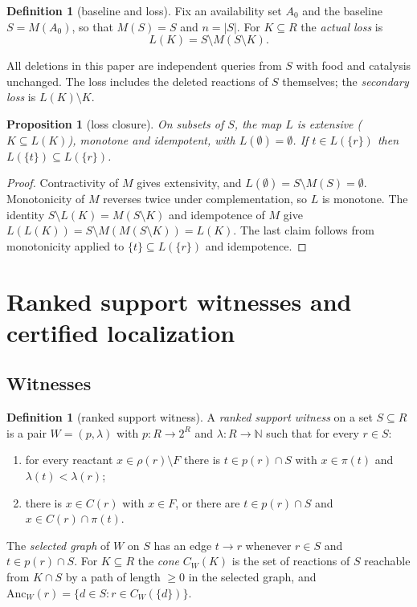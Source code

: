\documentclass[11pt,a4paper]{article}
\theoremstyle{plain}
\newtheorem{proposition}[theorem]{Proposition}
\theoremstyle{definition}
\newtheorem{definition}[theorem]{Definition}
\theoremstyle{remark}
\newcommand{\N}{\mathbb{N}}
\newcommand{\Anc}{\mathrm{Anc}}
\begin{document}
\begin{definition}[baseline and loss]
Fix an availability set $A_0$ and the baseline $S=M(A_0)$, so that $M(S)=S$ and $n=|S|$. For $K\subseteq R$ the \emph{actual loss} is
\[
L(K)=S\setminus M(S\setminus K).
\]
\end{definition}

All deletions in this paper are independent queries from $S$ with food and catalysis unchanged. The loss includes the deleted reactions of $S$ themselves; the \emph{secondary loss} is $L(K)\setminus K$.

\begin{proposition}[loss closure]\label{prop:lossclosure}
On subsets of $S$, the map $L$ is extensive ($K\subseteq L(K)$), monotone and idempotent, with $L(\emptyset)=\emptyset$. If $t\in L(\{r\})$ then $L(\{t\})\subseteq L(\{r\})$.
\end{proposition}

\begin{proof}
Contractivity of $M$ gives extensivity, and $L(\emptyset)=S\setminus M(S)=\emptyset$. Monotonicity of $M$ reverses twice under complementation, so $L$ is monotone. The identity $S\setminus L(K)=M(S\setminus K)$ and idempotence of $M$ give $L(L(K))=S\setminus M(M(S\setminus K))=L(K)$. The last claim follows from monotonicity applied to $\{t\}\subseteq L(\{r\})$ and idempotence.
\end{proof}

\section{Ranked support witnesses and certified localization}\label{sec:localization}

\subsection{Witnesses}

\begin{definition}[ranked support witness]\label{def:witness}
A \emph{ranked support witness} on a set $S\subseteq R$ is a pair $W=(p,\lambda)$ with $p:R\to 2^{R}$ and $\lambda:R\to\N$ such that for every $r\in S$:
\begin{enumerate}[label=(W\arabic*)]
\item for every reactant $x\in\rho(r)\setminus F$ there is $t\in p(r)\cap S$ with $x\in\pi(t)$ and $\lambda(t)<\lambda(r)$;
\item there is $x\in C(r)$ with $x\in F$, or there are $t\in p(r)\cap S$ and $x\in C(r)\cap\pi(t)$.
\end{enumerate}
The \emph{selected graph} of $W$ on $S$ has an edge $t\to r$ whenever $r\in S$ and $t\in p(r)\cap S$. For $K\subseteq R$ the \emph{cone} $C_W(K)$ is the set of reactions of $S$ reachable from $K\cap S$ by a path of length $\ge 0$ in the selected graph, and $\Anc_W(r)=\{d\in S: r\in C_W(\{d\})\}$.
\end{definition}
\end{document}

